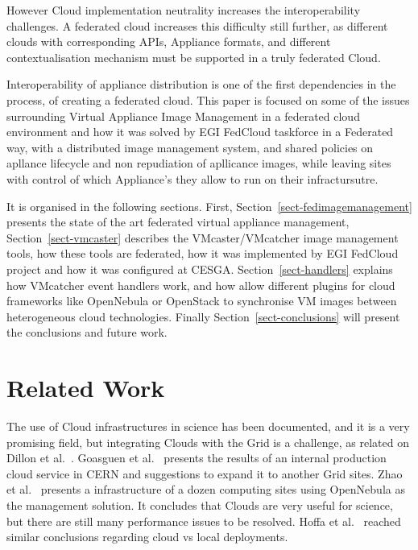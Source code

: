 \documentclass{llncs_Ibergrid2013}
\begin{document}
However Cloud implementation neutrality increases the interoperability challenges. A federated cloud increases this difficulty still further, as different clouds with corresponding APIs, Appliance formats, and different contextualisation mechanism must be supported in a truly federated Cloud. 

Interoperability of appliance distribution is one of the first dependencies in the process, of creating a federated cloud. This paper is focused on some of the issues surrounding Virtual Appliance Image Management in a federated cloud environment and how it was solved by EGI FedCloud taskforce in a Federated way, with a distributed image management system, and shared policies on apllance lifecycle and non repudiation of apllicance images, while leaving sites with control of which Appliance's they allow to run on their infractursutre.

It is organised in the following sections. First, Section~\ref{sect-fedimagemanagement} presents the state of the art federated virtual appliance management, Section~\ref{sect-vmcaster} describes the VMcaster/VMcatcher image management tools, how these tools are federated, how it was implemented by EGI FedCloud project and how it was configured at CESGA. 
Section~\ref{sect-handlers} explains how VMcatcher event handlers work, and how allow different plugins for cloud frameworks like OpenNebula or OpenStack to synchronise VM images between heterogeneous cloud technologies. 
Finally Section~\ref{sect-conclusions} will present the conclusions and future work.  



\section{Related Work}
\label{sect-relatedwork}
The use of Cloud infrastructures in science has been documented, and it is a very promising field, but integrating Clouds with the Grid is a challenge, as related on Dillon et al.~\cite{Dillon2010}. Goasguen et al.~\cite{Goasguen2012} presents the results of an internal production cloud service in CERN and suggestions to expand it to another Grid sites. Zhao et al.~\cite{Zhao2012} presents a infrastructure of a dozen computing sites using OpenNebula as the management solution. It concludes that Clouds are very useful for science, but there are still many performance issues to be resolved. Hoffa et al.~\cite{Hoffa2008} reached similar conclusions regarding cloud vs local deployments.
\end{document}
